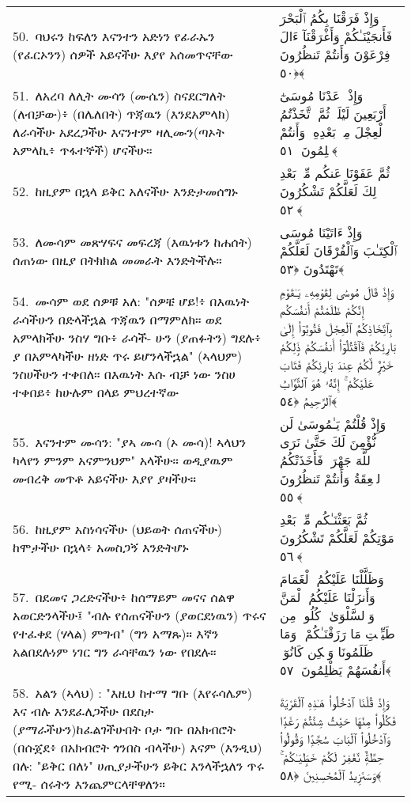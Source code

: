 \documentclass[11pt,a4paper,oneside]{article}%
\newcommand{\mytextarabic}[1]{\textarabic{ #1 \flushright}}
\begin{document}
\begin{longtable}{%
  @{}
    p{}
  @{~~~}
    p{}
    @{}
}
50.\ ባህሩን ከፍለን እናንተን አድነን የፊራኡን (የፈርኦንን) ሰዎች አይናችሁ እያየ  አሰመጥናቸው  &  \mytextarabic{وَإِذْ فَرَقْنَا بِكُمُ ٱلْبَحْرَ فَأَنجَيْنَـٰكُمْ وَأَغْرَقْنَآ ءَالَ فِرْعَوْنَ وَأَنتُمْ تَنظُرُونَ ﴿٥٠﴾}\\
51.\ ለአረባ ለሊት ሙሳን (ሙሴን) ስናደርግለት  (ለብቻው)፥ (በሌለበት) ጥጃዉን  (እንደአምላክ) ለራሳችሁ አደረጋችሁ እናንተም ዛሊሙን(ጣኦት አምላኪ፥ ጥፋተኞች) ሆናችሁ። &  \mytextarabic{وَإِذْ وَٟعَدْنَا مُوسَىٰٓ أَرْبَعِينَ لَيْلَةًۭ ثُمَّ ٱتَّخَذْتُمُ ٱلْعِجْلَ مِنۢ بَعْدِهِۦ وَأَنتُمْ ظَٟلِمُونَ ﴿٥١﴾}\\
52.\ ከዚያም በኋላ ይቅር አለናችሁ እንድታመሰግኑ &  \mytextarabic{ثُمَّ عَفَوْنَا عَنكُم مِّنۢ بَعْدِ ذَٟلِكَ لَعَلَّكُمْ تَشْكُرُونَ ﴿٥٢﴾}\\
53.\ ለሙሳም መጽሃፍና መፍረጃ (እዉነቱን ከሐሰት) ሰጠነው በዚያ በትክክል መመራት እንድትችሉ። &  \mytextarabic{وَإِذْ ءَاتَيْنَا مُوسَى ٱلْكِتَـٰبَ وَٱلْفُرْقَانَ لَعَلَّكُمْ تَهْتَدُونَ ﴿٥٣﴾}\\
54.\ ሙሳም ወደ ሰዎቹ አለ: "ሰዎቼ ሆይ!፥ በእዉነት ራሳችሁን በድላችኋል ጥጃዉን  በማምለክ። ወደ አምላክችሁ ንስሃ ግቡ፥ ራሳች- ሁን (ያጠፉትን) ግደሉ፥ ያ በአምላካችሁ ዘነድ ጥሩ ይሆንላችኋል" (ኣላህም) ንስሀችሁን ተቀበለ። በእዉነት እሱ ብቻ ነው ንስሀ ተቀበይ፥ ከሁሉም በላይ  ምህረተኛው &  \mytextarabic{وَإِذْ قَالَ مُوسَىٰ لِقَوْمِهِۦ يَـٰقَوْمِ إِنَّكُمْ ظَلَمْتُمْ أَنفُسَكُم بِٱتِّخَاذِكُمُ ٱلْعِجْلَ فَتُوبُوٓا۟ إِلَىٰ بَارِئِكُمْ فَٱقْتُلُوٓا۟ أَنفُسَكُمْ ذَٟلِكُمْ خَيْرٌۭ لَّكُمْ عِندَ بَارِئِكُمْ فَتَابَ عَلَيْكُمْ ۚ إِنَّهُۥ هُوَ ٱلتَّوَّابُ ٱلرَّحِيمُ ﴿٥٤﴾}\\
55.\ እናንተም ሙሳን: "ያኣ ሙሳ (ኦ ሙሳ)! ኣላህን ካላየን ምንም አናምንህም" አላችሁ። ወዲያዉም መብረቅ መጥቶ አይናችሁ እያየ ያዛችሁ። &  \mytextarabic{وَإِذْ قُلْتُمْ يَـٰمُوسَىٰ لَن نُّؤْمِنَ لَكَ حَتَّىٰ نَرَى ٱللَّهَ جَهْرَةًۭ فَأَخَذَتْكُمُ ٱلصَّٟعِقَةُ وَأَنتُمْ تَنظُرُونَ ﴿٥٥﴾}\\
56.\ ከዚያም አስነሳናችሁ (ህይወት ሰጠናችሁ) ከሞታችሁ በኋላ፥ አመስጋኝ እንድትሆኑ &  \mytextarabic{ثُمَّ بَعَثْنَـٰكُم مِّنۢ بَعْدِ مَوْتِكُمْ لَعَلَّكُمْ تَشْكُرُونَ ﴿٥٦﴾}\\
57.\ በደመና ጋረድናችሁ፥ ከሰማይም መናና  ሰልዋ አወርድንላችሁ፤ "ብሉ የሰጠናችሁን (ያወርደነዉን) ጥሩና የተፈቀደ (ሃላል) ምግብ" (ግን አማጹ)። እኛን አልበደሉነም ነገር ግን ራሳቸዉን ነው የበደሉ። &  \mytextarabic{وَظَلَّلْنَا عَلَيْكُمُ ٱلْغَمَامَ وَأَنزَلْنَا عَلَيْكُمُ ٱلْمَنَّ وَٱلسَّلْوَىٰ ۖ كُلُوا۟ مِن طَيِّبَٟتِ مَا رَزَقْنَـٰكُمْ ۖ وَمَا ظَلَمُونَا وَلَٟكِن كَانُوٓا۟ أَنفُسَهُمْ يَظْلِمُونَ ﴿٥٧﴾}\\
58.\ አልን (ኣላህ) : "እዚህ ከተማ ግቡ  (እየሩሳሌም) እና ብሉ እንደፈለጋችሁ በደስታ (ያማራችሁን)ከፈልገችሁበት ቦታ ግቡ በአክብሮት (በሱጀደ፥ በአክብሮት ጎንበስ ብላችሁ) እናም (እንዲህ) በሉ: "ይቅር በለነ" ሀጢያታችሁን ይቅር እንላችኋለን ጥሩ የሚ- ሰሩትን እንጨምርላቸዋለን። &  \mytextarabic{وَإِذْ قُلْنَا ٱدْخُلُوا۟ هَـٰذِهِ ٱلْقَرْيَةَ فَكُلُوا۟ مِنْهَا حَيْثُ شِئْتُمْ رَغَدًۭا وَٱدْخُلُوا۟ ٱلْبَابَ سُجَّدًۭا وَقُولُوا۟ حِطَّةٌۭ نَّغْفِرْ لَكُمْ خَطَٟيَـٰكُمْ ۚ وَسَنَزِيدُ ٱلْمُحْسِنِينَ ﴿٥٨﴾}\\

\end{longtable}
\end{document}
